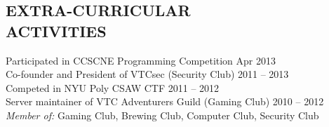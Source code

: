 \documentclass[margin]{res}
\begin{document}
\begin{resume}
\section{EXTRA-CURRICULAR \\ ACTIVITIES} 
                Participated in CCSCNE Programming Competition
                	\hfill Apr 2013\\
                Co-founder and President of VTCsec (Security Club) 
                    \hfill 2011 -- 2013\\
                Competed in NYU Poly CSAW CTF \hfill 2011 -- 2012\\
                Server maintainer of VTC Adventurers Guild (Gaming Club)
                    \hfill 2010 -- 2012\\
                {\sl Member of:} Gaming Club, Brewing Club, Computer Club, 
                                 Security Club
 

\end{resume}
\end{document}
